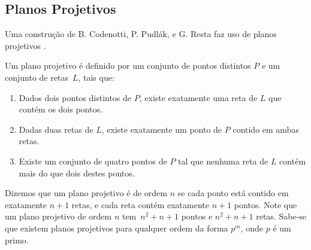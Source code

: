 

\subsection{Planos Projetivos}

Uma construção de B. Codenotti, P. Pudlák, e G. Resta faz uso de planos projetivos \cite{codenotti2000some}.

Um plano projetivo é definido por um conjunto de pontos distintos $P$  e um conjunto de retas~$L$, tais que:

\begin{enumerate}
\item Dados dois pontos distintos de $P$, existe exatamente uma reta de $L$ que contém os dois pontos. 
\item Dadas duas retas de $L$, existe exatamente um ponto de $P$ contido em ambas retas.
\item Existe um conjunto de quatro pontos de $P$ tal que nenhuma reta de $L$ contém mais do que dois destes pontos.
\end{enumerate}

Dizemos que um plano projetivo é de ordem $n$ se cada ponto está contido em exatamente $n+1$ retas, e cada reta contém exatamente $n+1$ pontos. Note que um plano projetivo de ordem $n$ tem~$n^2 + n + 1$ pontos e $n^2 + n + 1$ retas. Sabe-se que existem planos projetivos para qualquer ordem da forma $p^m$, onde $p$ é um primo.

